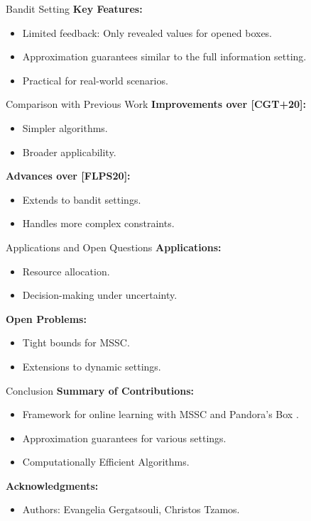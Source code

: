 \documentclass{beamer}
\begin{document}
\begin{frame}{Bandit Setting}
\textbf{Key Features:}
\begin{itemize}
    \item Limited feedback: Only revealed values for opened boxes.
    \item Approximation guarantees similar to the full information setting.
    \item Practical for real-world scenarios.
\end{itemize}
\end{frame}

\begin{frame}{Comparison with Previous Work}
\textbf{Improvements over [CGT+20]:}
\begin{itemize}
    \item Simpler algorithms.
    \item Broader applicability.
\end{itemize}
\textbf{Advances over [FLPS20]:}
\begin{itemize}
    \item Extends to bandit settings.
    \item Handles more complex constraints.
\end{itemize}
\end{frame}

\begin{frame}{Applications and Open Questions}
\textbf{Applications:}
\begin{itemize}
    \item Resource allocation.
    \item Decision-making under uncertainty.
\end{itemize}
\textbf{Open Problems:}
\begin{itemize}
    \item Tight bounds for MSSC.
    \item Extensions to dynamic settings.
\end{itemize}
\end{frame}

\begin{frame}{Conclusion}
\textbf{Summary of Contributions:}
\begin{itemize}
    \item Framework for online learning with MSSC and Pandora’s Box \cite{gergatsouli2022online}.
    \item Approximation guarantees for various settings.
    \item Computationally Efficient Algorithms.
\end{itemize}
\textbf{Acknowledgments:}
\begin{itemize}
    \item Authors: Evangelia Gergatsouli, Christos Tzamos.
\end{itemize}
\end{frame}



\end{document}
